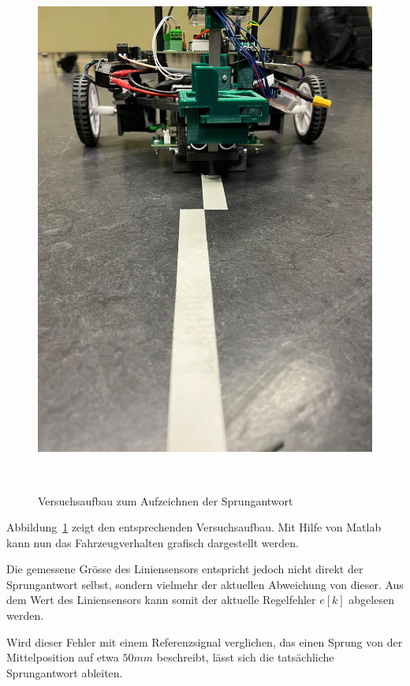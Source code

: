 \documentclass[main.tex]{subfiles} %
\begin{document}
\begin{figure}[H]
    \centering
    \includegraphics[width=1\linewidth]{fig_Parametrierung_Linienfolgeregler/Versuchsaufbau_Sprungantwort.jpeg}
    \caption{Versuchsaufbau zum Aufzeichnen der Sprungantwort}~\label{fig:Linienfolger_Versuchsaufbau_Sprungantwort}
\end{figure}

Abbildung~\ref{fig:Linienfolger_Versuchsaufbau_Sprungantwort} zeigt den
entsprechenden Versuchsaufbau. Mit Hilfe von Matlab kann nun das
Fahrzeugverhalten grafisch dargestellt werden.

Die gemessene Grösse des Liniensensors entspricht jedoch nicht direkt der
Sprungantwort selbst, sondern vielmehr der aktuellen Abweichung von dieser. Aus
dem Wert des Liniensensors kann somit der aktuelle Regelfehler $e[k]$ abgelesen
werden.

Wird dieser Fehler mit einem Referenzsignal verglichen, das einen Sprung von
der Mittelposition auf etwa $50mm$ beschreibt, lässt sich die tatsächliche
Sprungantwort ableiten.
\end{document}
